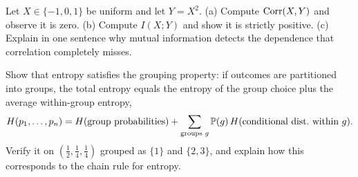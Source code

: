\begin{exercise}
\label{ch33:ex-mi-indep}
Let $X \in \{-1,0,1\}$ be uniform and let $Y = X^2$. (a) Compute $\Corr(X,Y)$ and observe it is zero.
(b) Compute $I(X;Y)$ and show it is strictly positive. (c) Explain in one sentence why mutual information
detects the dependence that correlation completely misses.
\end{exercise}

\begin{exercise}
\label{ch33:ex-grouping}
Show that entropy satisfies the grouping property: if outcomes are partitioned into groups, the total
entropy equals the entropy of the group choice plus the average within-group entropy,
\[
  H(p_1,\dots,p_n) = H(\text{group probabilities}) + \sum_{\text{groups } g} \P(g)\,H(\text{conditional dist.\ within } g).
\]
Verify it on $(\tfrac12,\tfrac14,\tfrac14)$ grouped as $\{1\}$ and $\{2,3\}$, and explain how this corresponds
to the chain rule for entropy.
\end{exercise}
